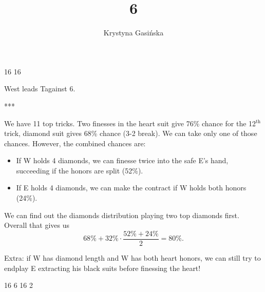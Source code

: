 \documentclass[12pt, a4paper]{article}
\title{6\nt}
\author{Krystyna Gasińska}
\begin{document}
\maketitle

\fhandp
        {}{16}
        {}{}
        {}{16}
        {}{}
        {}

West leads T\spades against 6\nt.
\begin{center}
    ***
\end{center}

We have 11 top tricks. Two finesses in the 
heart suit give 76\% chance for
the 12$^{\text{th}}$ trick, diamond suit gives 68\% chance 
(3-2 break).
We can take only one of those chances. 
However, the combined chances are:
\begin{itemize}
        \item If W holds 4 diamonds, we can finesse twice
        into the safe E's hand, succeeding if the
        honors are split (52\%).
        \item If E holds 4 diamonds, we can make the
        contract if W holds both \hearts honors (24\%).
\end{itemize}

We can find out the diamonds distribution playing 
two top diamonds first. Overall that gives us
$$68\%+32\%\cdot\frac{52\%+24\%}{2} = 80\%.$$

\newpage

Extra: if W has diamond length and W has both heart honors,
we can still try to endplay E extracting his black suits before
finessing the heart!

\fhandp
        {}{16}
        {}{6}
        {}{16}
        {}{2}
        {}
\end{document}
